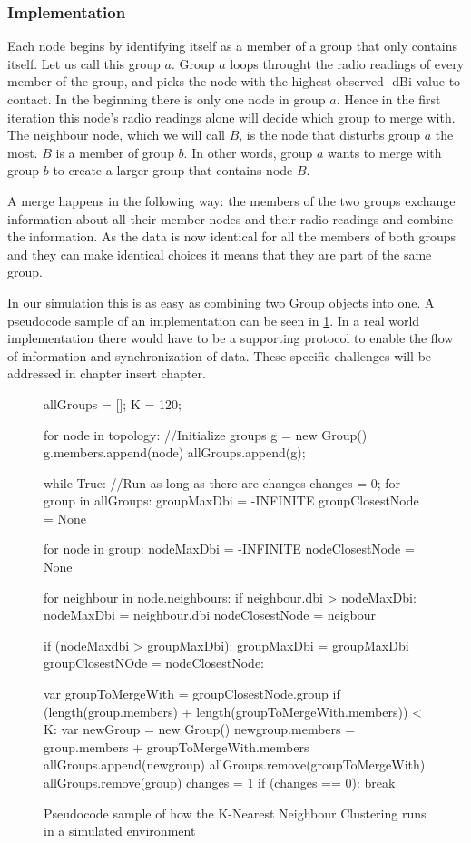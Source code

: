 \subsubsection{Implementation}
Each node begins by identifying itself as a member of a group that only contains itself.  Let us call this group $a$.
Group $a$ loops throught the radio readings of every member of the group, and picks the node with the highest observed -dBi value
to contact. In the beginning there is only one node in group $a$. Hence in the first iteration this node's radio readings alone will decide which group to merge with. 
The neighbour node, which we will call $B$, is the node that disturbs group $a$ the most. $B$ is a member of group $b$.
In other words, group $a$ wants to merge with group $b$ to create a larger group that contains node $B$.

A merge happens in the following way: the members of the two groups exchange information about all their member nodes and their radio readings and combine the information.
As the data is now identical for all the members of both groups and they can make identical choices it means that they are part of the same group. 

In our simulation this is as easy as combining two Group objects into one. A pseudocode sample of an implementation can be seen in \ref{fig:groupmerge}.
In a real world implementation there would have to be a supporting protocol to 
enable the flow of information and synchronization of data. These specific challenges will be addressed in chapter {{insert chapter}}.

	\begin{figure}
		\tiny
		\begin{python}
allGroups = [];
K = 120;

for node in topology: //Initialize groups
	g = new Group()
	g.members.append(node)
	allGroups.append(g);

while True: //Run as long as there are changes
	changes = 0;	
	for group in allGroups: 
		groupMaxDbi = -INFINITE
		groupClosestNode = None

		for node in group:
			nodeMaxDbi = -INFINITE
			nodeClosestNode = None

			for neighbour in node.neighbours:
				if neighbour.dbi > nodeMaxDbi:
					nodeMaxDbi = neighbour.dbi
					nodeClosestNode = neigbour

			if (nodeMaxdbi > groupMaxDbi):
				groupMaxDbi = groupMaxDbi
				groupClosestNOde = nodeClosestNode:

		var groupToMergeWith = groupClosestNode.group
		if (length(group.members) + length(groupToMergeWith.members)) < K:
			var newGroup = new Group()
			newgroup.members = group.members + groupToMergeWith.members
			allGroups.append(newgroup)
			allGroups.remove(groupToMergeWith)
			allGroups.remove(group)
			changes = 1
	if (changes == 0):
		break
		\end{python}
			\caption{Pseudocode sample of how the K-Nearest Neighbour Clustering runs in a simulated environment}
			\label{fig:groupmerge}
	\end{figure}



